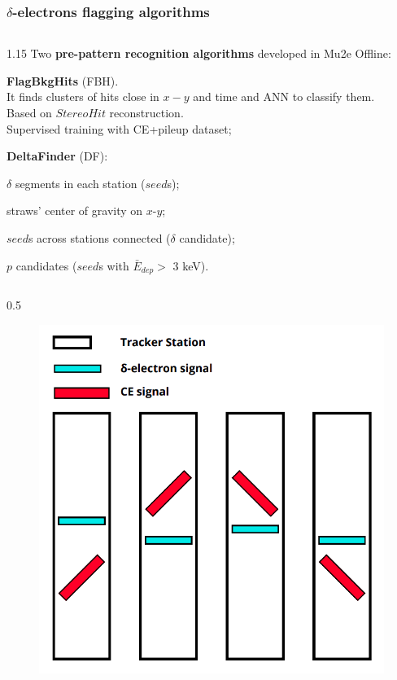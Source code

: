 \documentclass{beamer}
\begin{document}
\begin{frame}
    \frametitle{$\delta$-electrons flagging algorithms}
      \begin{columns}
        \begin{column}{1.15\framewidth}
       {\footnotesize Two \textbf{pre-pattern recognition  algorithms} developed in Mu2e Offline:}
    \setlength{\leftmargini}{1.2em}
    \vspace{0.5mm}
    \begin{itemize}
    {\footnotesize   
    \item \textbf{FlagBkgHits} (FBH). \\ It finds clusters of hits close in $x-y$ and time and ANN to classify them. \\ Based on $StereoHit$ reconstruction. \\ Supervised training with CE+pileup dataset;
    \vspace{0.5mm}
    \item \textbf{DeltaFinder} (DF):
    }
    \begin{itemize}
        {\footnotesize \item $\delta$ segments in each station ($seed$s);
\item  straws' center of gravity on $x$-$y$; 
\item $seed$s across stations connected ($\delta$ candidate); 
\item $p$ candidates ($seed$s with $\bar{E}_{dep}>$ 3 keV).}
    \end{itemize}
    \end{itemize}
    \end{column}
    \end{columns}
    \vspace{-3mm}
        \begin{columns}
        \begin{column}{0.5\framewidth}
            \begin{figure}[!h]
        \centering
        \hspace*{-2em}
        \includegraphics[width =0.6\columnwidth]{figures/png/Screenshot_20240811_123048.png}

\end{figure}
\end{column}
\end{columns}
\end{frame}
\end{document}
